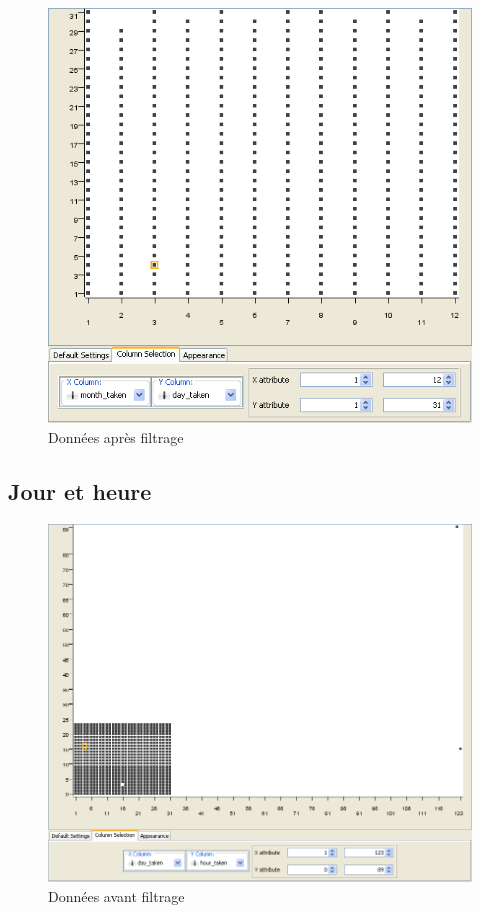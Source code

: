        \begin{figure}[h]
            \centering
            \includegraphics[scale=0.35]{../screenshots/month_day_after.png}
            \caption{Donn\'ees apr\`es filtrage}
            \label{diagram:month_day_after}
        \end{figure}

    \pagebreak
    \subsection{Jour et heure}
        \begin{figure}[h]
            \centering
            \includegraphics[scale=0.27]{../screenshots/day_hour_before.png}
            \caption{Donn\'ees avant filtrage}
            \label{diagram:day_hour_before}
        \end{figure}

